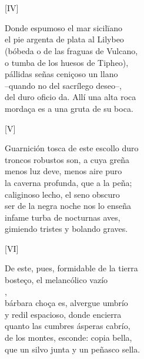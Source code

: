 \documentclass[11pt,a4paper,twoside]{article}
\begin{document}
\section*{\centering \fontsize{11}{14}\selectfont[FÁBVLA]}
\vspace{-1em}
%
\begin{center}
	[IV]
\end{center}
\pstart
Donde espumoso el mar sicilïano\\
el pie argenta de plata al Lilybeo\\
(bóbeda o de las fraguas de Vulcano,\\
o tumba de los huesos de Tipheo),\\
pállidas señas ceniçoso un llano\\
--quando no del sacrílego deseo--,\\
del duro oficio da. Allí una alta roca\\
mordaça es a una gruta de su boca.\par\pend
%
\begin{center}
	[V]
\end{center}
\pstart
Guarnición tosca de este escollo duro\\
troncos robustos son, a cuya greña\\
menos luz deve, menos aire puro\\
la caverna profunda, que a la peña;\\
caliginoso lecho, el seno obscuro\\
ser de la negra noche nos lo enseña\\
infame turba de nocturnas aves,\\
gimiendo tristes y bolando graves.\par\pend
%
\begin{center}
	[VI]
\end{center}\pstart
De este, pues, formidable de la tierra\\
bosteço, el melancólico vazío\\
,\\
bárbara choça es, alvergue umbrío\\
y redil espacioso, donde encierra\\
quanto las cumbres ásperas cabrío,\\
de los montes, esconde: copia bella,\\
que un silvo junta y un peñasco sella.\par\pend
\end{document}
